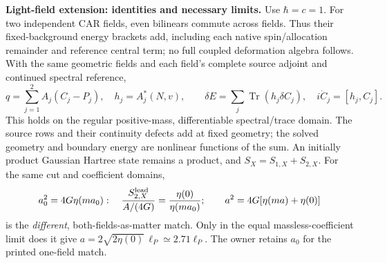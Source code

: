
\noindent\textbf{Light-field extension: identities and necessary limits.}
Use $\hbar=c=1$. For two independent CAR fields, even bilinears commute across fields.
Thus their fixed-background energy brackets add, including each native
spin/allocation remainder and reference central term; no full coupled
deformation algebra follows. With the same geometric fields and each
field's complete source adjoint and continued spectral reference,
\[
 q=\sum_{j=1}^2 A_j(C_j-P_j),\quad h_j=A_j^*(N,v),\qquad
 \delta E=\sum_j\operatorname{Tr}(h_j\delta C_j),\quad
 i\dot C_j=[h_j,C_j].
\]
This holds on the regular positive-mass, differentiable spectral/trace
domain. The source rows and their continuity defects add at fixed geometry;
the solved geometry and boundary energy are nonlinear functions of the sum.
An initially product Gaussian Hartree state remains a product, and
$S_X=S_{1,X}+S_{2,X}$. For the same cut and coefficient domains,
\[
 a_0^2=4G\eta(ma_0):\quad
 \frac{S_{2,X}^{\rm lead}}{A/(4G)}=\frac{\eta(0)}{\eta(ma_0)};
 \qquad a^2=4G[\eta(ma)+\eta(0)]
\]
is the \emph{different}, both-fields-as-matter match. Only in the equal
massless-coefficient limit does it give $a=2\sqrt{2\eta(0)}\,\ell_P
\simeq2.71\ell_P$. The owner retains $a_0$ for the printed one-field match.

